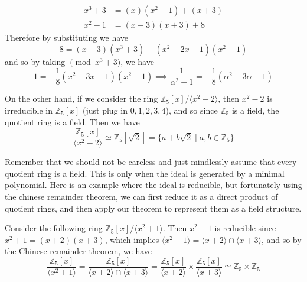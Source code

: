 \begin{example}
\begin{enumerate}
      \begin{align}
        x^3 + 3 & = (x) (x^2 - 1) + (x + 3) \label{hi}\\
        x^2 - 1 & = (x - 3) (x + 3) + 8
      \end{align}
      Therefore by substituting we have 
      \begin{equation}
        8 = (x - 3) (x^3 + 3) - (x^2 - 2x - 1) (x^2 - 1) 
      \end{equation} 
      and so by taking $\pmod{x^3 + 3}$, we have 
      \begin{equation}
        1 = -\frac{1}{8} (x^2 - 3x - 1) (x^2 - 1) \implies \frac{1}{\alpha^2 - 1} = -\frac{1}{8}(\alpha^2 - 3 \alpha - 1)
      \end{equation}
    \end{enumerate}
  \end{example}

  \begin{example}
    On the other hand, if we consider the ring $\mathbb{Z}_5 [x] / \langle x^2 - 2 \rangle$, then $x^2 - 2$ is irreducible in $\mathbb{Z}_5 [x]$ (just plug in $0, 1, 2, 3, 4$), and so since $\mathbb{Z}_5$ is a field, the quotient ring is a field. Then we have 
    \begin{equation}
      \frac{\mathbb{Z}_5 [x]}{\langle x^2 - 2 \rangle} \simeq \mathbb{Z}_5 [\sqrt{2}] = \{a + b \sqrt{2} \mid a, b \in \mathbb{Z}_5 \}
    \end{equation}
  \end{example} 

  Remember that we should not be careless and just mindlessly assume that every quotient ring is a field. This is only when the ideal is generated by a minimal polynomial. Here is an example where the ideal is reducible, but fortunately using the chinese remainder theorem, we can first reduce it as a direct product of quotient rings, and then apply our theorem to represent them as a field structure. 

  \begin{example}
    Consider the following ring $\mathbb{Z}_5 [x] / \langle x^2 + 1 \rangle$. Then $x^2 + 1$ is reducible since $x^2 + 1 = (x + 2) (x + 3)$, which implies $\langle x^2 + 1 \rangle = \langle x + 2 \rangle \cap \langle x + 3 \rangle$, and so by the Chinese remainder theorem, we have 
    \begin{equation}
      \frac{\mathbb{Z}_5 [x]}{\langle x^2 + 1 \rangle} = \frac{\mathbb{Z}_5 [x]}{\langle x + 2 \rangle \cap \langle x + 3 \rangle} = \frac{\mathbb{Z}_5 [x]}{\langle x + 2 \rangle} \times \frac{\mathbb{Z}_5 [x]}{\langle x + 3 \rangle} \simeq \mathbb{Z}_5 \times \mathbb{Z}_5
    \end{equation}
  \end{example} 

